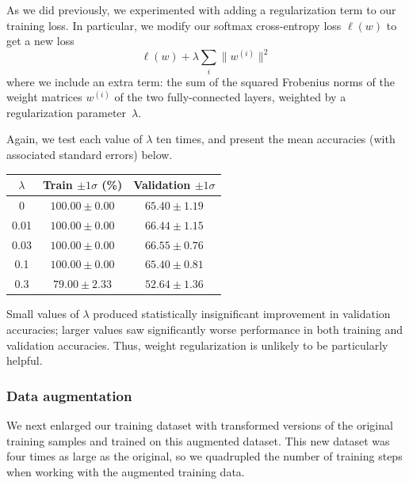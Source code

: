\documentclass{article}
\newcommand{\sind}[1]{^{(#1)}}
\begin{document}
\begin{multicols}{2}
As we did previously,  %
we experimented with adding a regularization term
to our training loss.
In particular, we modify our softmax cross-entropy loss $\ell(w)$
to get a new loss
\begin{equation}
    \ell(w) + \lambda\sum_i \lVert w\sind{i} \rVert^2
\end{equation}
where we include an extra term:
the sum of the squared Frobenius norms of the weight matrices $w\sind{i}$
of the two fully-connected layers,
weighted by a regularization parameter~$\lambda$.

Again, we test each value of $\lambda$ ten times,
and present the mean accuracies (with associated standard errors) below.

\begin{center}
    \begin{tabular}{c|cc}
        $\lambda$ & Train $\pm 1 \sigma$ (\%) & Validation $\pm 1 \sigma$\\\hline
        0    & $100.00 \pm 0.00$ & $65.40 \pm 1.19$ \\
        0.01 & $100.00 \pm 0.00$ & $66.44 \pm 1.15$ \\
        0.03 & $100.00 \pm 0.00$ & $66.55 \pm 0.76$ \\
        0.1  & $100.00 \pm 0.00$ & $65.40 \pm 0.81$ \\
        0.3  &  $79.00 \pm 2.33$ & $52.64 \pm 1.36$ \\
    \end{tabular}
\end{center}
Small values of $\lambda$ produced
statistically insignificant improvement in validation accuracies;
larger values saw significantly worse performance
in both training and validation accuracies.
Thus, weight regularization
is unlikely to be particularly helpful.


\subsubsection{Data augmentation}

We next enlarged our training dataset
with transformed versions of the original training samples
and trained on this augmented dataset.
This new dataset was four times as large as the original,
so we quadrupled the number of training steps
when working with the augmented training data.


\end{multicols}
\end{document}
